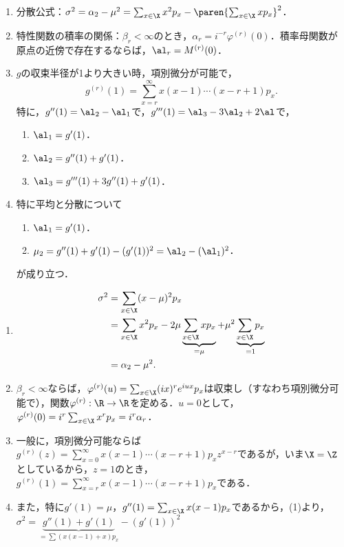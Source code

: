 \documentclass[uplatex,dvipdfmx]{jsreport}
\begin{document}
\begin{lemma}\label{lemma-variance-formula}\mbox{}
    \begin{enumerate}
        \item 分散公式：$\sigma^2=\alpha_2-\mu^2=\sum_{x\in\X}x^2p_x-\paren{\sum_{x\in\X}xp_x}^2$．
        \item 特性関数の積率の関係：$\beta_r<\infty$のとき，$\alpha_r=i^{-r}\varphi^{(r)}(0)$．積率母関数が原点の近傍で存在するならば，$\al_r=M^{(r)}(0)$．
        \item $g$の収束半径が1より大きい時，項別微分が可能で，
        \[g^{(r)}(1)=\sum_{x=r}^\infty x(x-1)\cdots(x-r+1)p_x.\]
        特に，$g''(1)=\al_2-\al_1$で，$g'''(1)=\al_3-3\al_2+2\al$で，
        \begin{enumerate}
            \item $\al_1=g'(1)$．
            \item $\al_2=g''(1)+g'(1)$．
            \item $\al_3=g'''(1)+3g''(1)+g'(1)$．
        \end{enumerate}
        \item 特に平均と分散について
        \begin{enumerate}
            \item $\al_1=g'(1)$．
            \item $\mu_2=g''(1)+g'(1)-(g'(1))^2=\al_2-(\al_1)^2$．
        \end{enumerate}
        が成り立つ．
    \end{enumerate}
\end{lemma}
\begin{Proof}\mbox{}
    \begin{enumerate}
        \item \begin{align*}
            \sigma^2&=\sum_{x\in\X}(x-\mu)^2p_x\\
            &=\sum_{x\in\X}x^2p_x-2\mu\underbrace{\sum_{x\in\X}xp_x}_{=\mu}+\mu^2\underbrace{\sum_{x\in\X}p_x}_{=1}\\
            &=\alpha_2-\mu^2.
        \end{align*}
        \item $\beta_r<\infty$ならば，$\varphi^{(r)}(u)=\sum_{x\in\X}(ix)^re^{iux}p_x$は収束し（すなわち項別微分可能で），関数$\varphi^{(r)}:\R\to\R$を定める．$u=0$として，$\varphi^{(r)}(0)=i^r\sum_{x\in\X}x^rp_x=i^r\alpha_r$．
        \item 一般に，項別微分可能ならば$g^{(r)}(z)=\sum^\infty_{x=0}x(x-1)\cdots(x-r+1)p_xz^{x-r}$であるが，いま$\X=\Z$としているから，$z=1$のとき，$g^{(r)}(1)=\sum^\infty_{x=r}x(x-1)\cdots(x-r+1)p_x$である．
        \item また，特に$g'(1)=\mu$，$g''(1)=\sum_{x\in\X}x(x-1)p_x$であるから，(1)より，$\sigma^2=\underbrace{g''(1)+g'(1)}_{=\sum(x(x-1)+x)p_x}-(g'(1))^2$
    \end{enumerate}
\end{Proof}
\end{document}
